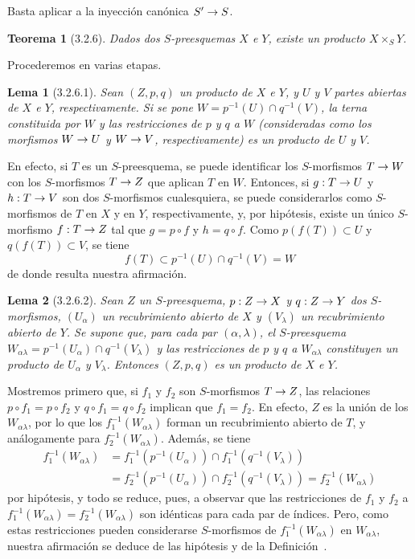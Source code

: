 \documentclass[oneside]{amsart}
\theoremstyle{ega-env-style}
\theoremstyle{ega-thm-env-style}
\newtheorem*{theorem}{Teorema}
\newtheorem*{lemma}{Lema}
\theoremstyle{ega-defn-env-style}
\renewcommand{\to}{\mathchoice{\longrightarrow}{\rightarrow}{\rightarrow}{\rightarrow}}
\newcommand{\oldpage}[2][]{{\marginnote{\normalfont{\textbf{#1}~|~#2}}}\ignorespaces}
\let\EGAOriginalLabel\label
\renewcommand{\label}[1]{\phantomsection\EGAOriginalLabel{#1}}
\begin{document}
\oldpage[I]{106}
Basta aplicar  a la inyección canónica $S'\to S$.

\begin{theorem}[3.2.6]
\label{I.3.2.6}
Dados dos $S$-preesquemas $X$ e $Y$, existe un producto $X\times_S Y$.
\end{theorem}

Procederemos en varias etapas.
\begin{lemma}[3.2.6.1]
\label{I.3.2.6.1}
Sean $(Z,p,q)$ un producto de $X$ e $Y$, y $U$ y $V$ partes abiertas de $X$ e $Y$,
respectivamente. Si se pone $W=p^{-1}(U)\cap q^{-1}(V)$, la terna constituida por $W$ y
las restricciones de $p$ y $q$ a $W$ \emph{(consideradas como los morfismos $W\to U$ y $W\to V$,
respectivamente)} es un producto de $U$ y $V$.
\end{lemma}

En efecto, si $T$ es un $S$-preesquema, se puede identificar los $S$-morfismos $T\to W$ con los
$S$-morfismos $T\to Z$ que aplican $T$ en $W$. Entonces, si $g:T\to U$ y $h:T\to V$ son dos
$S$-morfismos cualesquiera, se puede considerarlos como $S$-morfismos de $T$ en $X$ y en $Y$,
respectivamente, y, por hipótesis, existe un único $S$-morfismo $f:T\to Z$ tal que $g=p\circ f$ y
$h=q\circ f$. Como $p(f(T))\subset U$ y $q(f(T))\subset V$, se tiene
\[
  f(T)\subset p^{-1}(U)\cap q^{-1}(V)=W
\]
de donde resulta nuestra afirmación.

\begin{lemma}[3.2.6.2]
\label{I.3.2.6.2}
Sean $Z$ un $S$-preesquema, $p:Z\to X$ y $q:Z\to Y$ dos $S$-morfismos, $(U_\alpha)$ un recubrimiento
abierto de $X$ y $(V_\lambda)$ un recubrimiento abierto de $Y$. Se supone que, para cada par
$(\alpha,\lambda)$, el $S$-preesquema
$W_{\alpha\lambda}=p^{-1}(U_\alpha)\cap q^{-1}(V_\lambda)$ y las restricciones de $p$ y
$q$ a $W_{\alpha\lambda}$ constituyen un producto de $U_\alpha$ y $V_\lambda$. Entonces $(Z,p,q)$ es un
producto de $X$ e $Y$.
\end{lemma}

Mostremos primero que, si $f_1$ y $f_2$ son $S$-morfismos $T\to Z$, las relaciones
$p\circ f_1=p\circ f_2$ y $q\circ f_1=q\circ f_2$ implican que $f_1=f_2$. En efecto, $Z$ es la unión
de los $W_{\alpha\lambda}$, por lo que los $f_1^{-1}(W_{\alpha\lambda})$ forman un recubrimiento abierto de $T$,
y análogamente para $f_2^{-1}(W_{\alpha\lambda})$. Además, se tiene
\[
\begin{aligned}
  f_1^{-1}(W_{\alpha\lambda})
  &=f_1^{-1}(p^{-1}(U_\alpha))\cap
    f_1^{-1}(q^{-1}(V_\lambda)) \\
  &=f_2^{-1}(p^{-1}(U_\alpha))\cap
    f_2^{-1}(q^{-1}(V_\lambda))
   =f_2^{-1}(W_{\alpha\lambda})
\end{aligned}
\]
por hipótesis, y todo se reduce, pues, a observar que las restricciones de $f_1$ y $f_2$ a
$f_1^{-1}(W_{\alpha\lambda})=f_2^{-1}(W_{\alpha\lambda})$ son idénticas para cada par de
índices. Pero, como estas restricciones pueden considerarse $S$-morfismos de
$f_1^{-1}(W_{\alpha\lambda})$ en $W_{\alpha\lambda}$, nuestra afirmación se deduce de las
hipótesis y de la Definición~.
\end{document}
